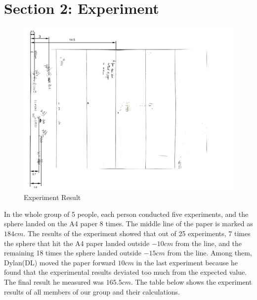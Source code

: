 \documentclass{article}
\begin{document}
\section{Section 2: Experiment}
    \begin{figure}[H]
        \centering
        \includegraphics[width=1\linewidth]{experiment result.png}
        \caption{Experiment Result}
        \label{simplevr}
    \end{figure}
    In the whole group of 5 people, each person conducted five experiments, and the sphere landed on the A4 paper 8 times. The middle line of the paper is marked as $184cm$. The results of the experiment showed that out of 25 experiments, 7 times the sphere that hit the A4 paper landed outside $-10cm$ from the line, and the remaining 18 times the sphere landed outside $-15cm$ from the line. Among them, Dylan(DL) moved the paper forward $10cm$ in the last experiment because he found that the experimental results deviated too much from the expected value. The final result he measured was $165.5cm$.
    The table below shows the experiment results of all members of our group and their calculations. 
\end{document}
